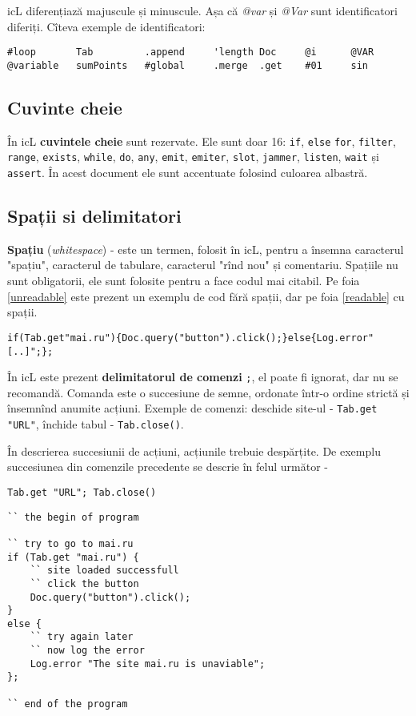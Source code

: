 icL diferențiază majuscule și minuscule. Așa că \textit{@var} și \textit{@Var} sunt identificatori diferiți. Cîteva exemple de identificatori:

\begin{lstlisting}[numbers=none]
#loop		Tab	    	.append		'length	Doc 	@i	 	@VAR
@variable	sumPoints	#global		.merge	.get	#01		sin
\end{lstlisting}

\subsection{Cuvinte cheie}

În icL \textbf{cuvintele cheie} sunt rezervate. Ele sunt doar 16: \lstinline|if|, \lstinline|else| \lstinline|for|, \lstinline|filter|, \lstinline|range|, \lstinline|exists|, \lstinline|while|, \lstinline|do|, \lstinline|any|, \lstinline|emit|, \lstinline|emiter|, \lstinline|slot|, \lstinline|jammer|, \lstinline|listen|, \lstinline|wait| și \lstinline|assert|. În acest document ele sunt accentuate folosind culoarea albastră.

\subsection{Spații si delimitatori}

\textbf{Spațiu} (\textit{whitespace}) - este un termen, folosit în icL, pentru a însemna caracterul "spațiu", caracterul de tabulare, caracterul "rînd nou" și comentariu. Spațiile nu sunt obligatorii, ele sunt folosite pentru a face codul mai citabil. Pe foia \ref{unreadable} este prezent un exemplu de cod fără spații, dar pe foia \ref{readable} cu spații.

\begin{lstlisting}[caption=Cod fără spații,label=unreadable]
if(Tab.get"mai.ru"){Doc.query("button").click();}else{Log.error"[..]";};
\end{lstlisting}

În icL este prezent \textbf{delimitatorul de comenzi} \lstinline|;|, el poate fi ignorat, dar nu se recomandă. Comanda este o succesiune de semne, ordonate într-o ordine strictă și însemnînd anumite acțiuni. Exemple de comenzi: deschide site-ul - \lstinline|Tab.get "URL"|, închide tabul - \lstinline|Tab.close()|.

În descrierea succesiunii de acțiuni, acțiunile trebuie despărțite. De exemplu succesiunea din comenzile precedente se descrie în felul următor -
\begin{lstlisting}[numbers=none]
Tab.get "URL"; Tab.close()
\end{lstlisting}

\begin{lstlisting}[caption=Cod cu spații,label=readable]
`` the begin of program

`` try to go to mai.ru
if (Tab.get "mai.ru") {
	`` site loaded successfull
	`` click the button
	Doc.query("button").click();
}
else {
	`` try again later
	`` now log the error
	Log.error "The site mai.ru is unaviable";
};

`` end of the program
\end{lstlisting}
